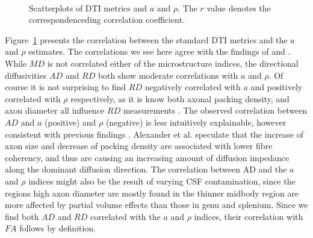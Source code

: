 \begin{figure}[ht]
{\begin{minipage}{0.5\textwidth}
					\begin{adjustbox}{width={\textwidth},totalheight=\textheight,keepaspectratio}
						\strut
						
					\end{adjustbox}\\
					\begin{adjustbox}{width={\textwidth},totalheight=\textheight,keepaspectratio}
						\strut
						
					\end{adjustbox}
					\end{minipage}
				}		
	\caption{Scatterplots of DTI metrics and $a$ and $\rho$. The $r$ value denotes the correspondenceding correlation coefficient.}
	\label{fig:chap 9 DTI correlations}	
\end{figure}	
Figure~\ref{fig:chap 9 DTI correlations} presents the correlation between the standard DTI metrics and the $a$ and $\rho$ estimates. The correlations we see here agree with the findings of \citep{Barazany:2009} and \citep{Alexander:2010}. While $MD$ is not correlated either of the microstructure indices, the directional diffusivities $AD$ and $RD$ both show moderate correlations with $a$ and $\rho$. Of course it is not surprising to find $RD$ negatively correlated with $a$ and positively correlated with $\rho$ respectively, as it is know both axonal packing density, and axon diameter all influence $RD$ measurements \citep{Beaulieu:2002}. The observed correlation between $AD$ and $a$ (positive) and $\rho$ (negative) is less intuitively explainable, however consistent with previous findings \citep{Barazany:2009,Alexander:2010}. Alexander et al. speculate that the increase of axon size and decrease of packing density are associated with lower fibre coherency, and thus are causing an increasing amount of diffusion impedance along the dominant diffusion direction. The correlation between AD and the $a$ and $\rho$ indices might also be the result of varying CSF contamination, since the regions high axon diameter are mostly found in the thinner midbody region are more affected by partial volume effects than those in genu and splenium. Since we find both $AD$ and $RD$ correlated with the $a$ and $\rho$ indices, their correlation with $FA$ follows by definition.  
\egroup %
\FloatBarrier
